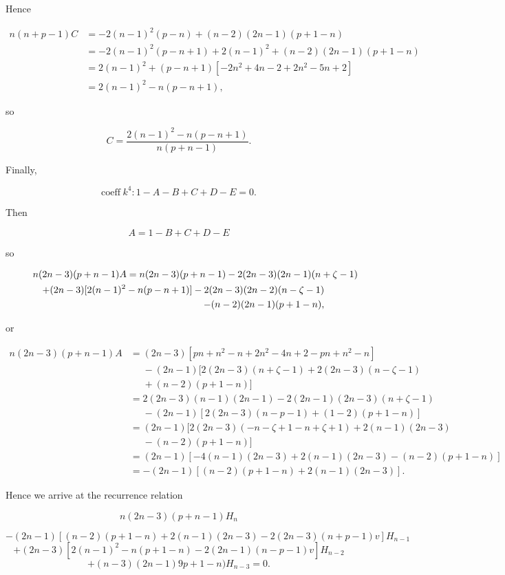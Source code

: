 \begin{solution}
Hence

$$\begin{array}{ll}
n(n+p-1)C &= -2(n-1)^2(p-n)+(n-2)(2n-1)(p+1-n) \\
&= -2(n-1)^2(p-n+1)+2(n-1)^2 + (n-2)(2n-1)(p+1-n) \\
&= 2(n-1)^2+(p-n+1)[-2n^2+4n-2+2n^2-5n+2] \\
&= 2(n-1)^2-n(p-n+1),
\end{array}$$

so

$$C = \dfrac{2(n-1)^2-n(p-n+1)}{n(p+n-1)}.$$

Finally,

$$\mathrm{coeff \hspace{3pt}} k^4: 1-A-B+C+D-E=0.$$

Then

$$A = 1-B+C+D-E$$

so

\begin{eqnarray*}
\lefteqn{n(2n-3)(p+n-1)A = n(2n-3)(p+n-1)-2(2n-3)(2n-1)(n+\zeta-1)} \\
&&+ (2n-3)[2(n-1)^2-n(p-n+1)]-2(2n-3)(2n-2)(n-\zeta-1) \\
&&- (n-2)(2n-1)(p+1-n),
\end{eqnarray*}

or

$$\begin{array}{ll}
n(2n-3)(p+n-1)A &= (2n-3)[pn+n^2-n+2n^2-4n+2-pn+n^2-n] \\
&\phantom{=}- (2n-1)[2(2n-3)(n+\zeta-1) + 2(2n-3)(n-\zeta-1)\\
&\phantom{=}+(n-2)(p+1-n)] \\
&= 2(2n-3)(n-1)(2n-1) - 2(2n-1)(2n-3)(n+\zeta-1)\\
&\phantom{=}-(2n-1)[2(2n-3)(n-p-1)+(1-2)(p+1-n)] \\
&=(2n-1)[2(2n-3)(-n-\zeta+1-n+\zeta+1)+2(n-1)(2n-3) \\
&\phantom{=}-(n-2)(p+1-n)] \\
&= (2n-1)[-4(n-1)(2n-3) + 2(n-1)(2n-3) - (n-2)(p+1-n)] \\
&=-(2n-1)[(n-2)(p+1-n)+2(n-1)(2n-3)].
\end{array}$$

Hence we arrive at the recurrence relation

$$n(2n-3)(p+n-1)H_n$$

$$-(2n-1)[(n-2)(p+1-n)+2(n-1)(2n-3)-2(2n-3)(n+p-1)v]H_{n-1}$$
$$+(2n-3)[2(n-1)^2-n(p+1-n)-2(2n-1)(n-p-1)v]H_{n-2}$$
$$+(n-3)(2n-1)9p+1-n)H_{n-3}=0.$$
\end{solution}
